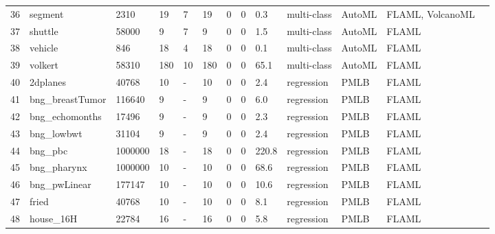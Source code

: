 \begin{table*}
\begin{tabular}{lllllllllllll}
36  & segment                                     & 2310    & 19     & 7     & 19    & 0      & 0         & 0.3       & multi-class & AutoML & FLAML, VolcanoML \\
37  & shuttle                                     & 58000   & 9      & 7     & 9     & 0      & 0         & 1.5       & multi-class & AutoML & FLAML            \\
38  & vehicle                                     & 846     & 18     & 4     & 18    & 0      & 0         & 0.1       & multi-class & AutoML & FLAML            \\
39  & volkert                                     & 58310   & 180    & 10    & 180   & 0      & 0         & 65.1      & multi-class & AutoML & FLAML            \\
40  & 2dplanes                                    & 40768   & 10     & -     & 10    & 0      & 0         & 2.4       & regression  & PMLB   & FLAML            \\
41  & bng\_breastTumor                            & 116640  & 9      & -     & 9     & 0      & 0         & 6.0       & regression  & PMLB   & FLAML            \\
42  & bng\_echomonths                             & 17496   & 9      & -     & 9     & 0      & 0         & 2.3       & regression  & PMLB   & FLAML            \\
43  & bng\_lowbwt                                 & 31104   & 9      & -     & 9     & 0      & 0         & 2.4       & regression  & PMLB   & FLAML            \\
44  & bng\_pbc                                    & 1000000 & 18     & -     & 18    & 0      & 0         & 220.8     & regression  & PMLB   & FLAML            \\
45  & bng\_pharynx                                & 1000000 & 10     & -     & 10    & 0      & 0         & 68.6      & regression  & PMLB   & FLAML            \\
46  & bng\_pwLinear                               & 177147  & 10     & -     & 10    & 0      & 0         & 10.6      & regression  & PMLB   & FLAML            \\
47  & fried                                       & 40768   & 10     & -     & 10    & 0      & 0         & 8.1       & regression  & PMLB   & FLAML            \\
48  & house\_16H                                  & 22784   & 16     & -     & 16    & 0      & 0         & 5.8       & regression  & PMLB   & FLAML            \\

\end{tabular}
\end{table*}
